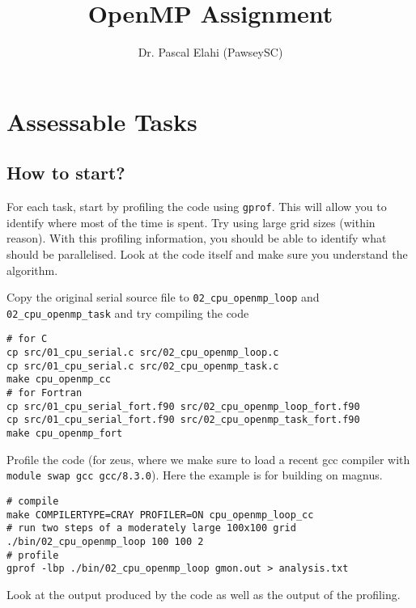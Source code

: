 \documentclass[11pt]{amsart}
\title[OpenMP]{OpenMP Assignment}
\author[]{Dr. Pascal Elahi (PawseySC)}
\begin{document}
\maketitle
\pagestyle{plain}


\newpage
\section{Assessable Tasks}\label{sec:tasks}
\subsection*{How to start?\nopunct\\} \label{sec:tasks:staring}
For each task, start by profiling the code using \texttt{gprof}. This will allow you to identify where most of the time is spent. Try using large grid sizes (within reason). With this profiling information, you should be able to identify what should be parallelised. Look at the code itself and make sure you understand the algorithm.

Copy the original serial source file to \texttt{02\_cpu\_openmp\_loop} and \texttt{02\_cpu\_openmp\_task} and try compiling the code
\begin{center}
\begin{minipage}{0.95\textwidth}
\begin{verbatim}
# for C
cp src/01_cpu_serial.c src/02_cpu_openmp_loop.c
cp src/01_cpu_serial.c src/02_cpu_openmp_task.c
make cpu_openmp_cc
# for Fortran
cp src/01_cpu_serial_fort.f90 src/02_cpu_openmp_loop_fort.f90
cp src/01_cpu_serial_fort.f90 src/02_cpu_openmp_task_fort.f90
make cpu_openmp_fort
\end{verbatim}
\end{minipage}
\end{center}
Profile the code (for zeus, where we make sure to load a recent gcc compiler with \texttt{module swap gcc gcc/8.3.0}).
Here the example is for building on magnus.
\begin{center}
\begin{minipage}{0.95\textwidth}
\begin{verbatim}
# compile
make COMPILERTYPE=CRAY PROFILER=ON cpu_openmp_loop_cc
# run two steps of a moderately large 100x100 grid
./bin/02_cpu_openmp_loop 100 100 2
# profile
gprof -lbp ./bin/02_cpu_openmp_loop gmon.out > analysis.txt
\end{verbatim}
\end{minipage}
\end{center}
Look at the output produced by the code as well as the output of the profiling.
\end{document}
